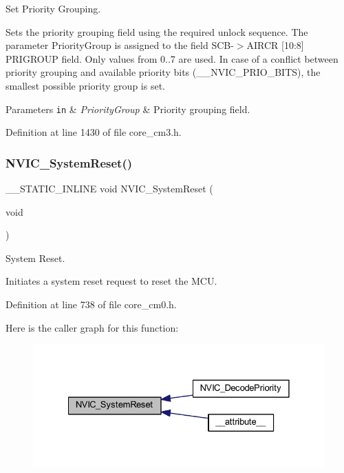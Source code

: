 Set Priority Grouping. 

Sets the priority grouping field using the required unlock sequence. The parameter Priority\+Group is assigned to the field S\+C\+B-\/$>$A\+I\+R\+CR \mbox{[}10\+:8\mbox{]} P\+R\+I\+G\+R\+O\+UP field. Only values from 0..7 are used. In case of a conflict between priority grouping and available priority bits (\+\_\+\+\_\+\+N\+V\+I\+C\+\_\+\+P\+R\+I\+O\+\_\+\+B\+I\+TS), the smallest possible priority group is set. 
\begin{DoxyParams}[1]{Parameters}
\mbox{\tt in}  & {\em Priority\+Group} & Priority grouping field. \\
\hline
\end{DoxyParams}


Definition at line 1430 of file core\+\_\+cm3.\+h.

\mbox{\label{group___c_m_s_i_s___core___n_v_i_c_functions_ga1143dec48d60a3d6f238c4798a87759c}} 
\subsubsection{\texorpdfstring{N\+V\+I\+C\+\_\+\+System\+Reset()}{NVIC\_SystemReset()}}
{\footnotesize\ttfamily \+\_\+\+\_\+\+S\+T\+A\+T\+I\+C\+\_\+\+I\+N\+L\+I\+NE void N\+V\+I\+C\+\_\+\+System\+Reset (\begin{DoxyParamCaption}\item[{void}]{ }\end{DoxyParamCaption})}



System Reset. 

Initiates a system reset request to reset the M\+CU. 

Definition at line 738 of file core\+\_\+cm0.\+h.

Here is the caller graph for this function\+:
\nopagebreak
\begin{figure}[H]
\begin{center}
\leavevmode
\includegraphics[width=328pt]{group___c_m_s_i_s___core___n_v_i_c_functions_ga1143dec48d60a3d6f238c4798a87759c_icgraph}
\end{center}
\end{figure}
